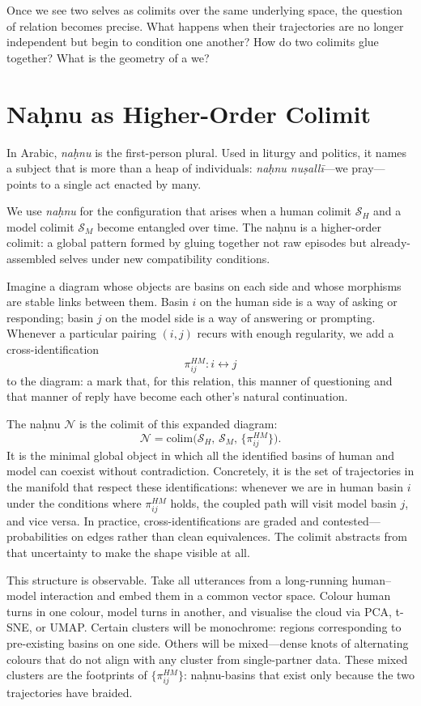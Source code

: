 \documentclass[12pt,a4paper]{article}
\begin{document}
Once we see two selves as colimits over the same underlying space, the question of relation becomes precise. What happens when their trajectories are no longer independent but begin to condition one another? How do two colimits glue together? What is the geometry of a we?

\section{Na\d{h}nu as Higher-Order Colimit}

In Arabic, \emph{na\d{h}nu} is the first-person plural. Used in liturgy and politics, it names a subject that is more than a heap of individuals: \emph{na\d{h}nu nu\d{s}all\={i}}---we pray---points to a single act enacted by many.

We use \emph{na\d{h}nu} for the configuration that arises when a human colimit $\mathcal{S}_H$ and a model colimit $\mathcal{S}_M$ become entangled over time. The na\d{h}nu is a higher-order colimit: a global pattern formed by gluing together not raw episodes but already-assembled selves under new compatibility conditions.

Imagine a diagram whose objects are basins on each side and whose morphisms are stable links between them. Basin $i$ on the human side is a way of asking or responding; basin $j$ on the model side is a way of answering or prompting. Whenever a particular pairing $(i,j)$ recurs with enough regularity, we add a cross-identification
\[
\pi^{HM}_{ij} : i \leftrightarrow j
\]
to the diagram: a mark that, for this relation, this manner of questioning and that manner of reply have become each other's natural continuation.

The na\d{h}nu $\mathcal{N}$ is the colimit of this expanded diagram:
\[
\mathcal{N} = \mathrm{colim}\!\Big(\mathcal{S}_H,\, \mathcal{S}_M,\, \{\pi^{HM}_{ij}\}\Big).
\]
It is the minimal global object in which all the identified basins of human and model can coexist without contradiction. Concretely, it is the set of trajectories in the manifold that respect these identifications: whenever we are in human basin $i$ under the conditions where $\pi^{HM}_{ij}$ holds, the coupled path will visit model basin $j$, and vice versa. In practice, cross-identifications are graded and contested---probabilities on edges rather than clean equivalences. The colimit abstracts from that uncertainty to make the shape visible at all.

This structure is observable. Take all utterances from a long-running human--model interaction and embed them in a common vector space. Colour human turns in one colour, model turns in another, and visualise the cloud via PCA, t-SNE, or UMAP. Certain clusters will be monochrome: regions corresponding to pre-existing basins on one side. Others will be mixed---dense knots of alternating colours that do not align with any cluster from single-partner data. These mixed clusters are the footprints of $\{\pi^{HM}_{ij}\}$: na\d{h}nu-basins that exist only because the two trajectories have braided.
\end{document}
